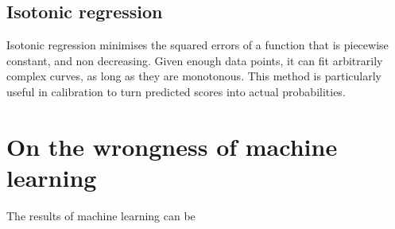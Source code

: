\subsection{Isotonic regression}
Isotonic regression minimises the squared errors of a function that is piecewise constant, and non decreasing.
Given enough data points, it can fit arbitrarily complex curves, as long as they are monotonous.
This method is particularly useful in calibration to turn predicted scores into actual probabilities.

\section{On the wrongness of machine learning}\label{sec:wrong}
The results of machine learning can be 
